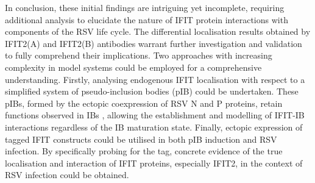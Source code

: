 In conclusion, these initial findings are intriguing yet incomplete, requiring additional analysis to elucidate the nature of IFIT protein interactions with components of the RSV life cycle. The differential localisation results obtained by IFIT2(A) and IFIT2(B) antibodies warrant further investigation and validation to fully comprehend their implications. Two approaches with increasing complexity in model systems could be employed for a comprehensive understanding. Firstly, analysing endogenous IFIT localisation with respect to a simplified system of pseudo-inclusion bodies (pIB) could be undertaken. These pIBs, formed by the ectopic coexpression of RSV N and P proteins, retain functions observed in IBs \cite{Rincheval2017FunctionalVirus, Galloux2020MinimalVitro, Jobe2020RespiratorySignaling}, allowing the establishment and modelling of IFIT-IB interactions regardless of the IB maturation state. Finally, ectopic expression of tagged IFIT constructs could be utilised in both pIB induction and RSV infection. By specifically probing for the tag, concrete evidence of the true localisation and interaction of IFIT proteins, especially IFIT2, in the context of RSV infection could be obtained.

